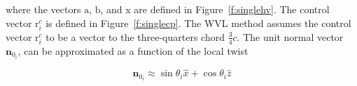 \documentclass[10pt, a4paper]{article}
\begin{document}
where the vectors $\bm{\mathrm{a}}$, $\bm{\mathrm{b}}$, and $\bm{\mathrm{x}}$ are defined in Figure~\ref{f:singlehv}. The control vector $\bm{\mathrm{r}}_i^c$ is defined in Figure~\ref{f:singlecp}. 
The WVL method assumes the control vector $\bm{\mathrm{r}}_i^c$ to be a vector to the three-quarters chord $\frac{3}{4}c$.  
The unit normal vector $\bm{n}_{0_i}$, can be approximated as a function of the local twist

\begin{equation}
    \bm{n}_{0_i} \approx \sin{\theta_i} \hat{x} + \cos{\theta_i} \hat{z}
\end{equation}

\begin{figure}[h!]
 \begin{subfigmatrix}{2}%

\end{subfigmatrix}
\end{figure}
\end{document}
